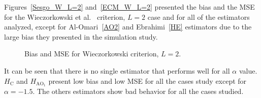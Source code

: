 \documentclass[journal]{IEEEtran}
\begin{document}
Figures~\ref{Sesgo_W_L=2} and~\ref{ECM_W_L=2} presented the bias and the MSE for the Wieczorkowski et al.~\cite{Wieczorkowski1999} criterion, $L=2$ case and for all of the estimators analyzed, except for Al-Omari~\eqref{AO2} and Ebrahimi~\eqref{HE} estimators due to the large bias they presented in the simulation study.  
\begin{figure}[hbt]
    \centering
	\caption{Bias and MSE for Wieczorkowski criterion, $L=2$.}
	\end{figure}    
It can be seen that there is no single estimator that performs well for all $\alpha$ value. $H_\text{C}$ and $H_{\text{AO}_1}$ present low bias and low MSE for all the cases study except for $\alpha=-1.5$. The others estimators show bad behavior for all the cases studied.	
\end{document}
